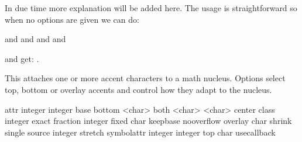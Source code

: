 In due time more explanation will be added here. The usage is straightforward so
when no options are given we can do:

\startbuffer
{} and
 and
\im {\Umiddle |} and
 and
\stopbuffer

\typebuffer

and get: \inlinebuffer .

\stopnewprimitive

\startnewprimitive[title={\prm {Umathaccent}}]

This attaches one or more accent characters to a math nucleus. Options select
top, bottom or overlay accents and control how they adapt to the nucleus.





\starttabulate[|Tl|l|l|]
\NC attr        \NC integer integer                               \NC \NC \NR
\NC base        \NC                                               \NC \NC \NR
\NC bottom      \NC \type {[fixed]} <char>                        \NC \NC \NR
\NC both        \NC \type {[fixed]} <char> \type {[fixed]} <char> \NC \NC \NR
\NC center      \NC                                               \NC \NC \NR
\NC class       \NC integer                                       \NC \NC \NR
\NC exact       \NC                                               \NC \NC \NR
\NC fraction    \NC integer                                       \NC \NC \NR
\NC fixed       \NC char                                          \NC \NC \NR
\NC keepbase    \NC                                               \NC \NC \NR
\NC nooverflow  \NC                                               \NC \NC \NR
\NC overlay     \NC\type {[fixed]} char                           \NC \NC \NR
\NC shrink      \NC                                               \NC \NC \NR
\NC single      \NC                                               \NC \NC \NR
\NC source      \NC integer                                       \NC \NC \NR
\NC stretch     \NC                                               \NC \NC \NR
\NC symbolattr  \NC integer integer                               \NC \NC \NR
\NC top         \NC \type {[fixed]} char                          \NC \NC \NR
\NC usecallback \NC                                               \NC \NC \NR
\stoptabulate

